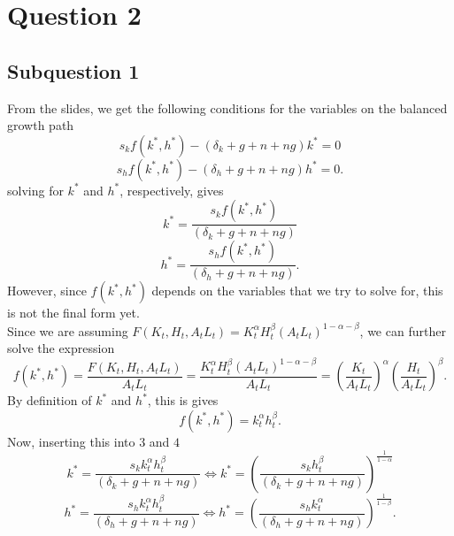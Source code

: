 \documentclass{article}
\begin{document}
\section{Question 2}
\subsection{Subquestion 1}
From the slides, we get the following conditions for the variables on the balanced growth path
\begin{equation}
s_k f\left(k^*,h^*\right)-\left(\delta_k +g+n+ng\right)k^*=0  
\end{equation}
\begin{equation}
s_h f\left(k^*, h^*\right) - \left(\delta_h + g + n + ng\right)h^* = 0.
\end{equation}
solving for $k^*$ and $h^*$, respectively, gives
\begin{equation}
k^*= \frac{s_k f\left(k^*,h^*\right)}{\left(\delta_k +g+n+ng\right)}
\end{equation}
\begin{equation}
h^* = \frac{s_h f\left(k^*,h^*\right)}{\left(\delta_h +g+n+ng\right)}.
\end{equation}
However, since $f\left(k^*,h^*\right)$ depends on the variables that we try to solve for, this is not the final form yet.\\
Since we are assuming $F\left(K_t,H_t,A_tL_t\right) = K_t^\alpha H_t^\beta \left(A_tL_t\right)^{1-\alpha-\beta}$, we can further solve the expression
\begin{equation}
f \left( k^*,h^* \right) = \frac{F \left( K_t,H_t,A_t L_t\right )}{A_t L_t} = \frac{K_t^\alpha H_t^\beta \left(A_tL_t\right)^{1-\alpha-\beta}}{A_t L_t} = \left(\frac{K_t}{A_t L_t}\right)^\alpha \left(\frac{H_t}{A_t L_t}\right)^\beta.
\end{equation}
By definition of $k^*$ and $h^*$, this is gives
\begin{equation}
f\left(k^*,h^*\right) = k_t^\alpha h_t^\beta.
\end{equation}
Now, inserting this into $3$ and $4$
\begin{equation}
k^*= \frac{s_k k_t^\alpha h_t^\beta}{\left(\delta_k +g+n+ng\right)} \Leftrightarrow k^*= \left(\frac{s_k h_t^\beta}{\left(\delta_k +g+n+ng\right)}\right)^{\frac{1}{1-\alpha}}
\end{equation}
\begin{equation}
h^* = \frac{s_h k_t^\alpha h_t^\beta}{\left(\delta_h +g+n+ng\right)} \Leftrightarrow h^*= \left(\frac{s_h k_t^\alpha}{\left(\delta_h +g+n+ng\right)}\right)^{\frac{1}{1-\beta}}.
\end{equation}
\end{document}
